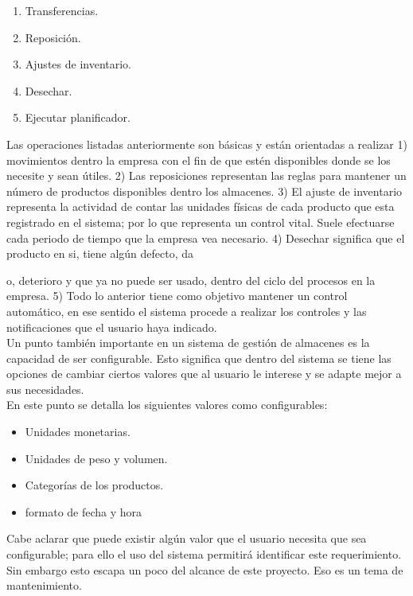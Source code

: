 \begin{enumerate}
\item Transferencias.
\item Reposición.
\item Ajustes de inventario.
\item Desechar.
\item Ejecutar planificador.
\end{enumerate}

Las operaciones listadas anteriormente son básicas y están orientadas a realizar 1) movimientos dentro la empresa con el fin de que estén disponibles donde se los necesite y sean útiles. 2) Las reposiciones representan las reglas para mantener un número de productos disponibles dentro los almacenes. 3) El ajuste de inventario representa la actividad de contar las unidades físicas de cada producto que esta registrado en el sistema; por lo que representa un control vital. Suele efectuarse cada periodo de tiempo que la empresa vea necesario. 4) Desechar significa que el producto en si, tiene algún defecto, da{o, deterioro y que ya no puede ser usado, dentro del ciclo del procesos en la empresa. 5) Todo lo anterior tiene como objetivo mantener un control automático, en ese sentido el sistema procede a realizar los controles y las notificaciones que el usuario haya indicado.\\

Un punto también importante en un sistema de gestión de almacenes es la capacidad de ser configurable. Esto significa que dentro del sistema se tiene las opciones de cambiar ciertos valores que al usuario le interese y se adapte mejor a sus necesidades.\\

En este punto se detalla los siguientes valores como configurables:

\begin{itemize}
\item Unidades monetarias.
\item Unidades de peso y volumen.
\item Categorías de los productos.
\item formato de fecha y hora
\end{itemize}

Cabe aclarar que puede existir algún valor que el usuario necesita que sea configurable; para ello el uso del sistema permitirá identificar este requerimiento. Sin embargo esto escapa un poco del alcance de este proyecto. Eso es un tema de mantenimiento.

}
